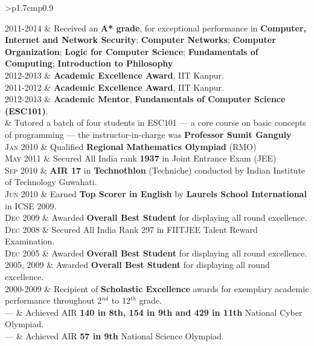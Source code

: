 \documentclass[a4paper,10pt]{article} %
\newcommand{\itemlist}[1]{
    \begin{tabular}{>{\raggedleft}p{1.7cm}p{0.9\linewidth}}
        #1
    \end{tabular}
}
\begin{document}
\itemlist {
    \textsc{2011-2014}   & Received an \textbf{A* grade}, for exceptional performance in
                            \textbf{Computer, Internet and Network Security};
                            \textbf{Computer Networks};
                            \textbf{Computer Organization};
                            \textbf{Logic for Computer Science};
                            \textbf{Fundamentals of Computing};
                            \textbf{Introduction to Philosophy} \\
    \textsc{2012-2013}   & \textbf{Academic Excellence Award}, IIT Kanpur. \\
    \textsc{2011-2012}   & \textbf{Academic Excellence Award}, IIT Kanpur. \\
    \textsc{2012-2013}   & \textbf{Academic Mentor}, \textbf{Fundamentals of Computer Science (ESC101)}. \\
                         & \footnotesize{Tutored a batch of four students in ESC101 --- a core course on
                            basic concepts of programming --- the instructor-in-charge was \textbf{Professor Sumit Ganguly}}\\
    \textsc{Jan 2010}    & Qualified \textbf{Regional Mathematics Olympiad} (RMO) \\
    \textsc{May 2011}    & Secured All India rank \textbf{1937} in Joint Entrance Exam (JEE) \\
    \textsc{Sep 2010}    & \textbf{AIR 17} in \textbf{Technothlon} (Techniche) conducted by Indian Institute of Technology Guwahati. \\
    \textsc{Jun 2010}    & Earned \textbf{Top Scorer in English} by \textbf{Laurels School International} in ICSE 2009. \\
    \textsc{Dec 2009}    & Awarded \textbf{Overall Best Student} for displaying all round excellence. \\
    \textsc{Dec 2008}    & Secured All India Rank 297 in FIITJEE Talent Reward Examination. \\
    \textsc{Dec 2005}    & Awarded \textbf{Overall Best Student} for displaying all round excellence. \\
    \textsc{2005, 2009}    & Awarded \textbf{Overall Best Student} for displaying all round excellence. \\
    \textsc{2000-2009}   & Recipient of \textbf{Scholastic Excellence} awards for exemplary academic performance throughout
                            2$^{nd}$ to 12$^{th}$ grade. \\
    \textsc{---}         & Achieved AIR \textbf{140 in 8th, 154 in 9th and 429 in 11th} National Cyber Olympiad.\\
    \textsc{---}         & Achieved AIR \textbf{57 in 9th} National Science Olympiad.\\
}
\end{document}
